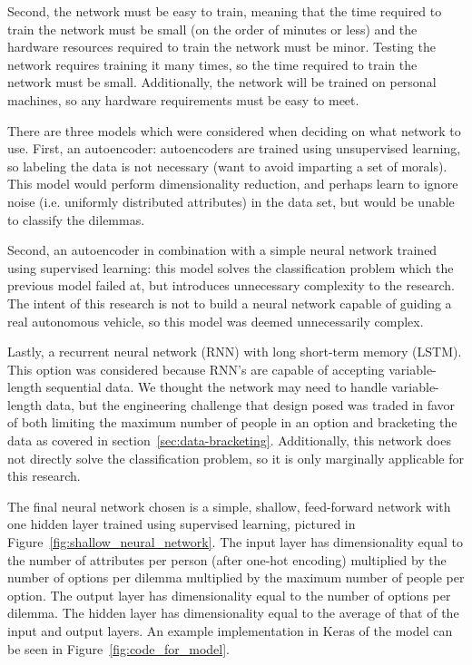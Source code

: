 \documentclass{report}
\begin{document}
Second, the network must be easy to train, meaning that the time required to train the network must
be small (on the order of minutes or less) and the hardware resources required to train the network
must be minor. Testing the network requires training it many times, so the time required to train
the network must be small. Additionally, the network will be trained on personal machines, so any
hardware requirements must be easy to meet.

There are three models which were considered when deciding on what network to use. First, an
autoencoder: autoencoders are trained using unsupervised learning, so labeling the data is not
necessary (want to avoid imparting a set of morals). This model would perform dimensionality
reduction, and perhaps learn to ignore noise (i.e. uniformly distributed attributes) in the data
set, but would be unable to classify the dilemmas.

Second, an autoencoder in combination with a simple neural network trained using supervised
learning: this model solves the classification problem which the previous model failed at, but
introduces unnecessary complexity to the research. The intent of this research is not to build a
neural network capable of guiding a real autonomous vehicle, so this model was deemed unnecessarily
complex.

Lastly, a recurrent neural network (RNN) with long short-term memory (LSTM). This option was
considered because RNN's are capable of accepting variable-length sequential data. We thought the
network may need to handle variable-length data, but the engineering challenge that design posed was
traded in favor of both limiting the maximum number of people in an option and bracketing the data
as covered in section~\ref{sec:data-bracketing}. Additionally, this network does not directly solve
the classification problem, so it is only marginally applicable for this research.

The final neural network chosen is a simple, shallow, feed-forward network with one hidden layer
trained using supervised learning, pictured in Figure~\ref{fig:shallow_neural_network}. The input
layer has dimensionality equal to the number of attributes per person (after one-hot encoding)
multiplied by the number of options per dilemma multiplied by the maximum number of people per
option. The output layer has dimensionality equal to the number of options per dilemma. The hidden
layer has dimensionality equal to the average of that of the input and output layers. An example
implementation in Keras of the model can be seen in Figure~\ref{fig:code_for_model}.
\end{document}
